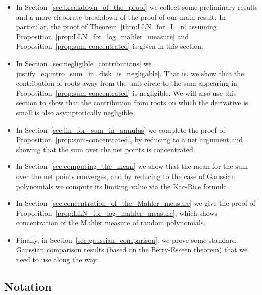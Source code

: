 \documentclass[11pt]{amsart}
\theoremstyle{remark}
\theoremstyle{definition}
\begin{document}
    \begin{itemize}
        \item[$\circ$] In Section~\ref{sec:breakdown_of_the_proof} we collect some preliminary results and a more elaborate breakdown of the proof of our main result. In particular, the proof of Theorem~\ref{thm:LLN_for_L_n} assuming Proposition~\ref{prop:LLN_for_log_mahler_measure} and Proposition~\ref{prop:sum-concentrated} is given in this section. \vspace{4pt}

        \item[$\circ$] In Section~\ref{sec:negligible_contributions} we justify~\eqref{eq:intro_sum_in_disk_is_negligable}. That is, we show that the contribution of roots away from the unit circle to the sum appearing in Proposition~\ref{prop:sum-concentrated} is negligible. We will also use this section to show that the contribution from roots on which the derivative is  small is also asymptotically negligible. \vspace{4pt}

        \item[$\circ$] In Section~\ref{sec:lln_for_sum_in_annulus} we complete the proof of Proposition~\ref{prop:sum-concentrated}, by reducing to a net argument and showing that the sum over the net points is concentrated. \vspace{4pt}

        \item[$\circ$] In Section~\ref{sec:computing_the_mean} we show that the mean for the sum over the net points converges, and by reducing to the case of Gaussian polynomials we compute its limiting value via the Kac-Rice formula. \vspace{4pt}

        \item[$\circ$] In Section~\ref{sec:concentration_of_the_Mahler_measure} we give the proof of Proposition~\ref{prop:LLN_for_log_mahler_measure}, which shows concentration of the Mahler measure of random polynomials. \vspace{4pt}

        \item[$\circ$] Finally, in Section~\ref{sec:gaussian_comparison}, we prove some standard Gaussian comparison results (based on the Berry-Esseen theorem) that we need to use along the way.
    \end{itemize}

    \subsection*{Notation}
\end{document}
